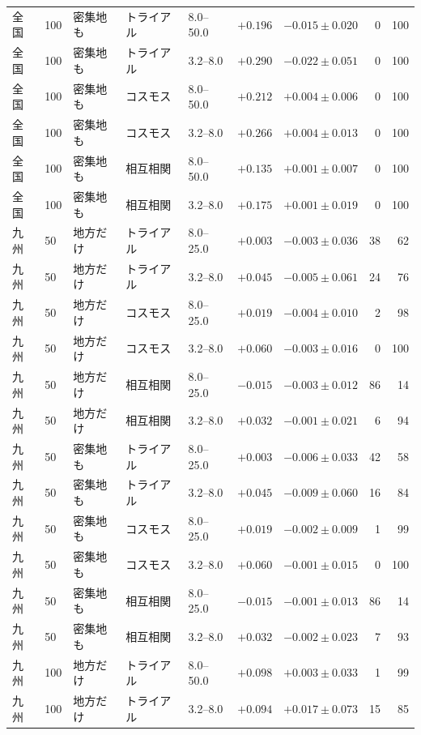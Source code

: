\begin{tabular}{lllllrrrr}
全国 & 100 & 密集地も & トライアル & 8.0--50.0 & $+0.196$ & $-0.015 \pm 0.020$ & 0 & 100 \\
全国 & 100 & 密集地も & トライアル & 3.2--8.0 & $+0.290$ & $-0.022 \pm 0.051$ & 0 & 100 \\
全国 & 100 & 密集地も & コスモス & 8.0--50.0 & $+0.212$ & $+0.004 \pm 0.006$ & 0 & 100 \\
全国 & 100 & 密集地も & コスモス & 3.2--8.0 & $+0.266$ & $+0.004 \pm 0.013$ & 0 & 100 \\
全国 & 100 & 密集地も & 相互相関 & 8.0--50.0 & $+0.135$ & $+0.001 \pm 0.007$ & 0 & 100 \\
全国 & 100 & 密集地も & 相互相関 & 3.2--8.0 & $+0.175$ & $+0.001 \pm 0.019$ & 0 & 100 \\
\midrule
九州 & 50 & 地方だけ & トライアル & 8.0--25.0 & $+0.003$ & $-0.003 \pm 0.036$ & 38 & 62 \\
九州 & 50 & 地方だけ & トライアル & 3.2--8.0 & $+0.045$ & $-0.005 \pm 0.061$ & 24 & 76 \\
九州 & 50 & 地方だけ & コスモス & 8.0--25.0 & $+0.019$ & $-0.004 \pm 0.010$ & 2 & 98 \\
九州 & 50 & 地方だけ & コスモス & 3.2--8.0 & $+0.060$ & $-0.003 \pm 0.016$ & 0 & 100 \\
九州 & 50 & 地方だけ & 相互相関 & 8.0--25.0 & $-0.015$ & $-0.003 \pm 0.012$ & 86 & 14 \\
九州 & 50 & 地方だけ & 相互相関 & 3.2--8.0 & $+0.032$ & $-0.001 \pm 0.021$ & 6 & 94 \\
九州 & 50 & 密集地も & トライアル & 8.0--25.0 & $+0.003$ & $-0.006 \pm 0.033$ & 42 & 58 \\
九州 & 50 & 密集地も & トライアル & 3.2--8.0 & $+0.045$ & $-0.009 \pm 0.060$ & 16 & 84 \\
九州 & 50 & 密集地も & コスモス & 8.0--25.0 & $+0.019$ & $-0.002 \pm 0.009$ & 1 & 99 \\
九州 & 50 & 密集地も & コスモス & 3.2--8.0 & $+0.060$ & $-0.001 \pm 0.015$ & 0 & 100 \\
九州 & 50 & 密集地も & 相互相関 & 8.0--25.0 & $-0.015$ & $-0.001 \pm 0.013$ & 86 & 14 \\
九州 & 50 & 密集地も & 相互相関 & 3.2--8.0 & $+0.032$ & $-0.002 \pm 0.023$ & 7 & 93 \\
\midrule
九州 & 100 & 地方だけ & トライアル & 8.0--50.0 & $+0.098$ & $+0.003 \pm 0.033$ & 1 & 99 \\
九州 & 100 & 地方だけ & トライアル & 3.2--8.0 & $+0.094$ & $+0.017 \pm 0.073$ & 15 & 85 \\

\end{tabular}
